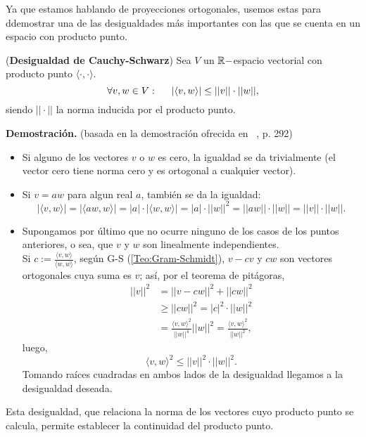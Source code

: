 \noindent Ya que estamos hablando de proyecciones ortogonales,
usemos estas para ddemostrar
una de las desigualdades
más importantes con las que se cuenta en un espacio
con producto punto.

\begin{teo}
(\textbf{Desigualdad de Cauchy-Schwarz}) \label{Teo:CauchySchwarz}
Sea $V$ un $\mathbb{R}-$espacio vectorial con producto punto 
$ \langle \cdot  , \cdot  \rangle$.
\[
\forall v , w \in V : \hspace{0.5cm}
|\langle  v , w \rangle | \leq ||v|| \cdot ||w||,
\] 
siendo $|| \cdot ||$
la norma inducida por el producto punto.
\end{teo}
\noindent
\textbf{Demostración.}
(basada en la demostración
ofrecida en ~\cite{Lang}, p. 292)
\begin{itemize}
\item Si alguno de los vectores $v$ o $w$ es cero,
la igualdad se da trivialmente (el vector cero tiene norma
cero y es ortogonal a cualquier vector). 

\item Si $v=a w$ para algun real $a$, también se 
da la igualdad:
\[
|\langle  v , w \rangle | =
|\langle  aw , w \rangle | = |a| \cdot  |\langle  w , w \rangle | =  
 |a| \cdot ||w||^{2}
=||aw|| \cdot ||w|| = ||v|| \cdot ||w||.
\]
\item Supongamos por último que no ocurre ninguno
de los casos de los puntos anteriores, o sea, que
$v$ y $w$ son linealmente independientes. \\
Si $c:=\frac{\langle v , w \rangle}{\langle w , w \rangle}$,
según G-S (\ref{Teo:Gram-Schmidt}), 
$v-cv$ y $cw$ son vectores ortogonales cuya suma es $v$;
así, por el teorema de pitágoras,
\begin{align*}
||v||^{2} & = ||v-cw||^{2} + ||cw||^{2} \\
& \geq ||cw||^{2}= |c|^{2} \cdot ||w||^{2} \\
& = \frac{\langle v , w \rangle ^{2}}{||w||^{4}}||w||^{2}
= \frac{\langle v , w \rangle ^{2}}{||w||^{2}},
\end{align*}
luego, 
\[
\langle  v , w \rangle ^{2}  \leq ||v||^{2} \cdot ||w||^{2}.
\]
Tomando raíces cuadradas en ambos lados de la
desigualdad llegamos a la desigualdad deseada. \QEDB
\end{itemize}
\vspace{0.2cm}


Esta desigualdad, que relaciona la norma de los
vectores cuyo producto punto se calcula, permite
establecer la continuidad del producto punto. \\


